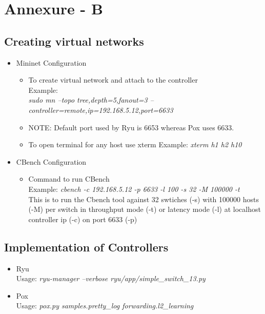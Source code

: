 \chapter*{Annexure - B}

\section*{Creating virtual networks}

\begin{itemize}

    \item Mininet Configuration

    \begin{itemize}
    
        \item To create virtual network and attach to the controller\\
        Example: \\
        \emph{sudo mn --topo tree,depth=5,fanout=3 --controller=remote,ip=192.168.5.12,port=6633}
        \item NOTE: Default port used by Ryu is 6653 whereas Pox uses 6633.
        \item To open terminal for any host use xterm
        Example: \emph{xterm h1 h2 h10}
    \end{itemize}
    
    \item CBench Configuration
        
    \begin{itemize}
        \item Command to run CBench\\
        Example: \emph{cbench -c 192.168.5.12 -p 6633 -l 100 -s 32 -M 100000 -t}\\
        This is to run the Cbench tool against 32 swtiches (-s) with 100000 hosts (-M) per switch in throughput mode (-t) or latency mode (-l) at localhost controller ip (-c) on port 6633 (-p) 
    \end{itemize}
    
\end{itemize}

\section*{Implementation of Controllers}
\begin{itemize}
\item Ryu \\
Usage: \emph{ryu-manager --verbose ryu/app/simple\_switch\_13.py}
\end{itemize}
\begin{itemize}
\item Pox \\
Usage: \emph{pox.py samples.pretty\_log forwarding.l2\_learning}
\end{itemize}


